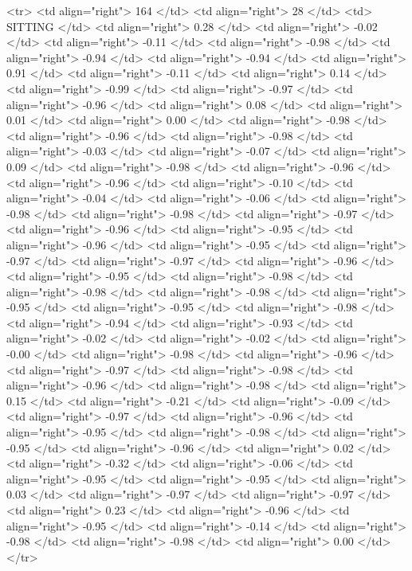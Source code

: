   <tr> <td align="right"> 164 </td> <td align="right">  28 </td> <td> SITTING </td> <td align="right"> 0.28 </td> <td align="right"> -0.02 </td> <td align="right"> -0.11 </td> <td align="right"> -0.98 </td> <td align="right"> -0.94 </td> <td align="right"> -0.94 </td> <td align="right"> 0.91 </td> <td align="right"> -0.11 </td> <td align="right"> 0.14 </td> <td align="right"> -0.99 </td> <td align="right"> -0.97 </td> <td align="right"> -0.96 </td> <td align="right"> 0.08 </td> <td align="right"> 0.01 </td> <td align="right"> 0.00 </td> <td align="right"> -0.98 </td> <td align="right"> -0.96 </td> <td align="right"> -0.98 </td> <td align="right"> -0.03 </td> <td align="right"> -0.07 </td> <td align="right"> 0.09 </td> <td align="right"> -0.98 </td> <td align="right"> -0.96 </td> <td align="right"> -0.96 </td> <td align="right"> -0.10 </td> <td align="right"> -0.04 </td> <td align="right"> -0.06 </td> <td align="right"> -0.98 </td> <td align="right"> -0.98 </td> <td align="right"> -0.97 </td> <td align="right"> -0.96 </td> <td align="right"> -0.95 </td> <td align="right"> -0.96 </td> <td align="right"> -0.95 </td> <td align="right"> -0.97 </td> <td align="right"> -0.97 </td> <td align="right"> -0.96 </td> <td align="right"> -0.95 </td> <td align="right"> -0.98 </td> <td align="right"> -0.98 </td> <td align="right"> -0.98 </td> <td align="right"> -0.95 </td> <td align="right"> -0.95 </td> <td align="right"> -0.98 </td> <td align="right"> -0.94 </td> <td align="right"> -0.93 </td> <td align="right"> -0.02 </td> <td align="right"> -0.02 </td> <td align="right"> -0.00 </td> <td align="right"> -0.98 </td> <td align="right"> -0.96 </td> <td align="right"> -0.97 </td> <td align="right"> -0.98 </td> <td align="right"> -0.96 </td> <td align="right"> -0.98 </td> <td align="right"> 0.15 </td> <td align="right"> -0.21 </td> <td align="right"> -0.09 </td> <td align="right"> -0.97 </td> <td align="right"> -0.96 </td> <td align="right"> -0.95 </td> <td align="right"> -0.98 </td> <td align="right"> -0.95 </td> <td align="right"> -0.96 </td> <td align="right"> 0.02 </td> <td align="right"> -0.32 </td> <td align="right"> -0.06 </td> <td align="right"> -0.95 </td> <td align="right"> -0.95 </td> <td align="right"> 0.03 </td> <td align="right"> -0.97 </td> <td align="right"> -0.97 </td> <td align="right"> 0.23 </td> <td align="right"> -0.96 </td> <td align="right"> -0.95 </td> <td align="right"> -0.14 </td> <td align="right"> -0.98 </td> <td align="right"> -0.98 </td> <td align="right"> 0.00 </td> </tr>
